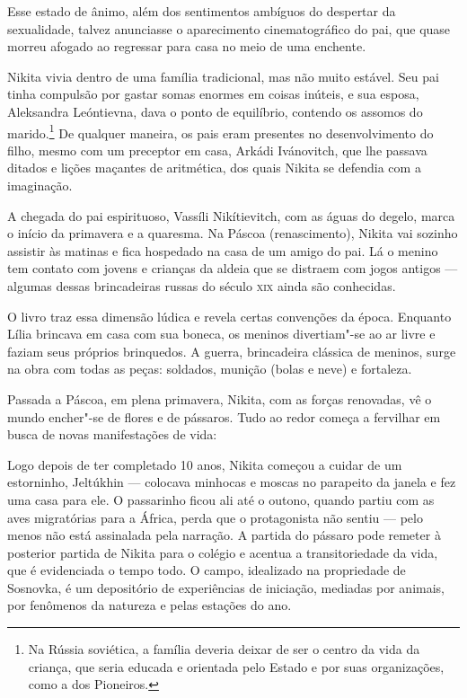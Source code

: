 Esse estado de ânimo, além dos sentimentos ambíguos do despertar da
sexualidade, talvez anunciasse o aparecimento cinematográfico do pai,
que quase morreu afogado ao regressar para casa no meio de uma enchente.

Nikita vivia dentro de uma família tradicional, mas não muito estável.
Seu pai tinha compulsão por gastar somas enormes em coisas inúteis, e
sua esposa, Aleksandra Leóntievna, dava o ponto de equilíbrio, contendo
os assomos do marido.\footnote{Na Rússia soviética, a família deveria
  deixar de ser o centro da vida da criança, que seria educada e
  orientada pelo Estado e por suas organizações, como a dos Pioneiros.}
De qualquer maneira, os pais eram presentes no desenvolvimento do filho,
mesmo com um preceptor em casa, Arkádi Ivánovitch, que lhe passava
ditados e lições maçantes de aritmética, dos quais Nikita se defendia
com a imaginação.

A chegada do pai espirituoso, Vassíli Nikítievitch, com as águas do
degelo, marca o início da primavera e a quaresma. Na Páscoa
(renascimento), Nikita vai sozinho assistir às matinas e fica hospedado
na casa de um amigo do pai. Lá o menino tem contato com jovens e
crianças da aldeia que se distraem com jogos antigos --- algumas dessas
brincadeiras russas do século \textsc{xix} ainda são conhecidas.

O livro traz essa dimensão lúdica e revela certas convenções da época.
Enquanto Lília brincava em casa com sua boneca, os meninos divertiam"-se
ao ar livre e faziam seus próprios brinquedos. A guerra, brincadeira
clássica de meninos, surge na obra com todas as peças: soldados, munição
(bolas e neve) e fortaleza.

Passada a Páscoa, em plena primavera, Nikita, com as forças renovadas,
vê o mundo encher"-se de flores e de pássaros. Tudo ao redor começa a
fervilhar em busca de novas manifestações de vida:

\begin{quote}
\end{quote}

Logo depois de ter completado 10 anos, Nikita começou a cuidar de um
estorninho, Jeltúkhin --- colocava minhocas e moscas no parapeito da
janela e fez uma casa para ele. O passarinho ficou ali até o outono,
quando partiu com as aves migratórias para a África, perda que o
protagonista não sentiu --- pelo menos não está assinalada pela
narração. A partida do pássaro pode remeter à posterior partida de
Nikita para o colégio e acentua a transitoriedade da vida, que é
evidenciada o tempo todo. O campo, idealizado na propriedade de Sosnovka,
é um depositório de experiências de iniciação, mediadas por animais, por
fenômenos da natureza e pelas estações do ano.

